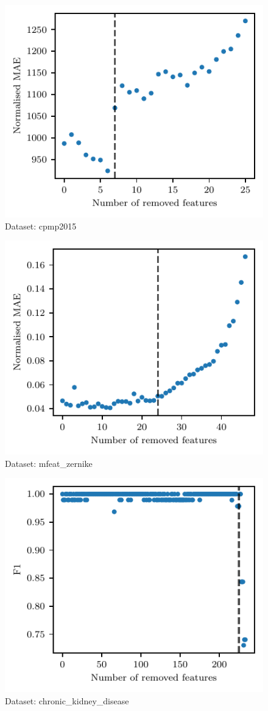 \documentclass[3p,review,authoryear]{elsarticle}
\begin{document}
\begin{figure}[h!]
    \centering
    \includegraphics{loss_cpm.pdf}
    \caption{Dataset: cpmp2015}
    \label{fig:loss_cpm}
\end{figure}

\begin{figure}[h!]
    \centering
    \includegraphics{loss_mfeat.pdf}
    \caption{Dataset: mfeat\_zernike}
    \label{fig:loss_mfeat}
\end{figure}

\begin{figure}[h!]
    \centering
    \includegraphics{loss_chronic.pdf}
    \caption{Dataset: chronic\_kidney\_disease}
    \label{fig:loss_chronic}
\end{figure}
\end{document}
